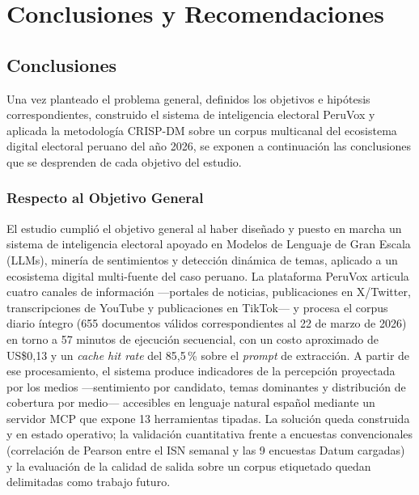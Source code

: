 \chapter{Conclusiones y Recomendaciones}
\section{Conclusiones}
Una vez planteado el problema general, definidos los objetivos e hipótesis
correspondientes, construido el sistema de inteligencia electoral PeruVox y
aplicada la metodología CRISP-DM sobre un corpus multicanal del ecosistema
digital electoral peruano del año 2026, se exponen a continuación las
conclusiones que se desprenden de cada objetivo del estudio.
\subsection*{Respecto al Objetivo General}
El estudio cumplió el objetivo general al haber diseñado y puesto en marcha un
sistema de inteligencia electoral apoyado en Modelos de Lenguaje de Gran Escala
(LLMs), minería de sentimientos y detección dinámica de temas, aplicado a un
ecosistema digital multi-fuente del caso peruano. La plataforma PeruVox articula
cuatro canales de información —portales de noticias, publicaciones en X/Twitter,
transcripciones de YouTube y publicaciones en TikTok— y procesa el corpus diario
íntegro (655 documentos válidos correspondientes al 22 de marzo de 2026) en
torno a 57 minutos de ejecución secuencial, con un costo aproximado de
US\$0{,}13 y un \textit{cache hit rate} del 85{,}5\,\% sobre el \textit{prompt}
de extracción. A partir de ese procesamiento, el sistema produce indicadores de
la percepción proyectada por los medios —sentimiento por candidato, temas
dominantes y distribución de cobertura por medio— accesibles en lenguaje natural
español mediante un servidor MCP que expone 13 herramientas tipadas. La solución
queda construida y en estado operativo; la validación cuantitativa frente a
encuestas convencionales (correlación de Pearson entre el ISN semanal y las 9
encuestas Datum cargadas) y la evaluación de la calidad de salida sobre un
corpus etiquetado quedan delimitadas como trabajo futuro.
